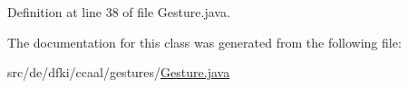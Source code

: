 Definition at line 38 of file Gesture.\-java.



The documentation for this class was generated from the following file\-:\begin{DoxyCompactItemize}
\item 
src/de/dfki/ccaal/gestures/\hyperlink{_gesture_8java}{Gesture.\-java}\end{DoxyCompactItemize}
